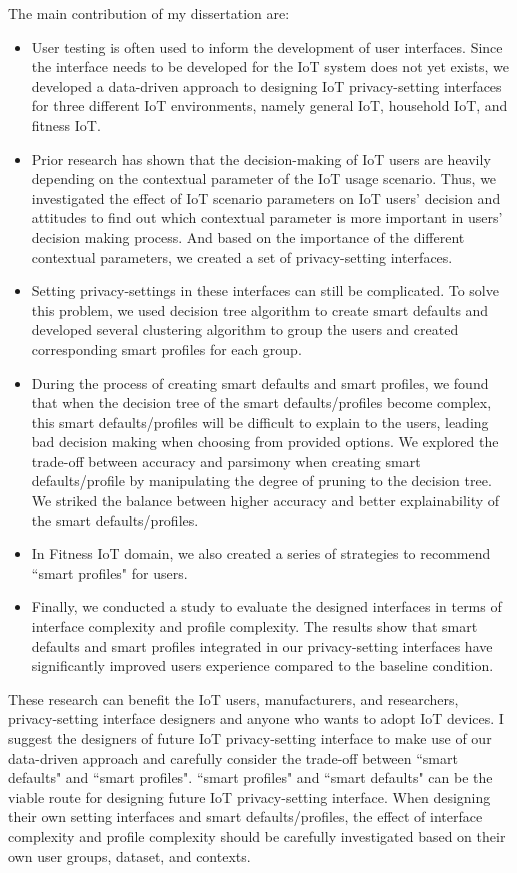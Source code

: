 The main contribution of my dissertation are:
\begin{itemize}
	\item User testing is often used to inform the development of user interfaces. Since the interface needs to be developed for the IoT system does not yet exists, we developed a data-driven approach to designing IoT privacy-setting interfaces for three different IoT environments, namely general IoT, household IoT, and fitness IoT.
	\item Prior research has shown that the decision-making of IoT users are heavily depending on the contextual parameter of the IoT usage scenario. Thus, we investigated the effect of IoT scenario parameters on IoT users’ decision and attitudes to find out which contextual parameter is more important in users’ decision making process. And based on the importance of the different contextual parameters, we created a set of privacy-setting interfaces.
	\item Setting privacy-settings in these interfaces can still be complicated. To solve this problem, we used decision tree algorithm to create smart defaults and developed several clustering algorithm to group the users and created corresponding smart profiles for each group.
	\item During the process of creating smart defaults and smart profiles, we found that when the decision tree of the smart defaults/profiles become complex, this smart defaults/profiles will be difficult to explain to the users, leading bad decision making when choosing from provided options. We explored the trade-off between accuracy and parsimony when creating smart defaults/profile by manipulating the degree of pruning to the decision tree. We striked the balance between higher accuracy  and better explainability of the smart defaults/profiles.
	\item In Fitness IoT domain, we also created a series of strategies to recommend ``smart profiles" for users.
	\item Finally, we conducted a study to evaluate the designed interfaces in terms of interface complexity and profile complexity. The results show that smart defaults and smart profiles integrated in our privacy-setting interfaces have significantly improved users experience compared to the baseline condition.
\end{itemize}

These research can benefit the IoT users, manufacturers, and researchers, privacy-setting interface designers and anyone who wants to adopt IoT devices.
I suggest the designers of future IoT privacy-setting interface to make use of our data-driven approach and carefully consider the trade-off between ``smart defaults" and ``smart profiles". ``smart profiles" and ``smart defaults" can be the viable route for designing future IoT privacy-setting interface. When designing their own setting interfaces and smart defaults/profiles, the effect of interface complexity and profile complexity should be carefully investigated based on their own user groups, dataset, and contexts.


